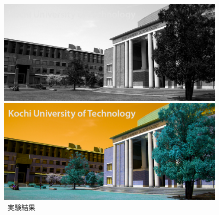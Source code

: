 \begin{figure}[H]
\begin{minipage}[b]{.19\textwidth}
    \end{minipage}
    \begin{minipage}[b]{.19\textwidth}
        \centering
        \includegraphics[keepaspectratio,width=\textwidth]{../../Figures/05_13_b.png}
    \end{minipage}
    \begin{minipage}[b]{.19\textwidth}
        \centering
        \includegraphics[keepaspectratio,width=\textwidth]{../../Figures/05_14_change.png}
    \end{minipage}
    \caption{\kadaiaa\ 実験結果}
\end{figure}
